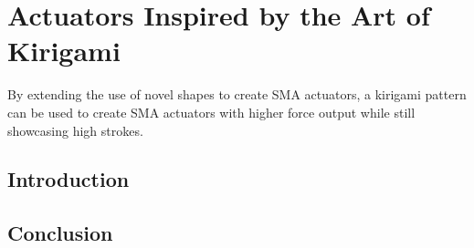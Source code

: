 
\chapter{Actuators Inspired by the Art of Kirigami}
By extending the use of novel shapes to create SMA actuators, a kirigami pattern can be used to create SMA actuators with higher force output while still showcasing high strokes.
\section{Introduction}
\section{Conclusion}
